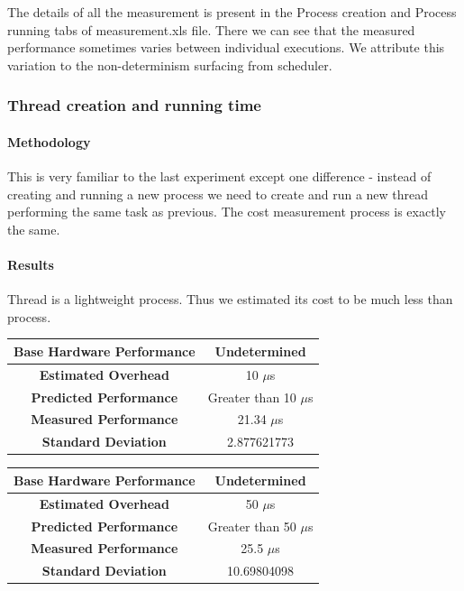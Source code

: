 \documentclass[conference]{IEEEtran}
\begin{document}
The details of all the measurement is present in the Process creation and Process running tabs of measurement.xls file. There we can see that the measured performance sometimes varies between individual executions. We attribute this variation to the non-determinism surfacing from scheduler.



\subsubsection{Thread creation and running time}

\paragraph{Methodology}

This is very familiar to the last experiment except one difference - instead of creating and running a new process we need to create and run a new thread performing the same task as previous. 
The cost measurement process is exactly the same.

\paragraph{Results}

Thread is a lightweight process. Thus we estimated its cost to be much less than process.

\begin{center}
\begin{tabular}{ |c|c| } 
  \hline
  \textbf{Base Hardware Performance} & Undetermined \\ 
  \hline
  \textbf{Estimated Overhead} &  10 $\mu$s \\ 
  \hline
  \textbf{Predicted Performance} & Greater than 10 $\mu$s \\ 
  \hline
  \textbf{Measured Performance} & 21.34 $\mu$s \\ 
  \hline
  \textbf{Standard Deviation} & 2.877621773  \\ 
  \hline
\end{tabular}
\end{center}



\begin{center}
\begin{tabular}{ |c|c| } 
  \hline
  \textbf{Base Hardware Performance} & Undetermined \\ 
  \hline
  \textbf{Estimated Overhead} &  50 $\mu$s \\ 
  \hline
  \textbf{Predicted Performance} & Greater than 50 $\mu$s \\ 
  \hline
  \textbf{Measured Performance} & 25.5 $\mu$s \\ 
  \hline
  \textbf{Standard Deviation} & 10.69804098  \\ 
  \hline
\end{tabular}
\end{center}
\end{document}
